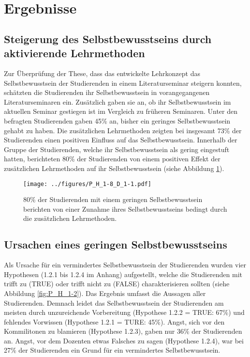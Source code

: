 \section{Ergebnisse}

\subsection{Steigerung des Selbstbewusstseins durch aktivierende Lehrmethoden}
Zur Überprüfung der These, dass das entwickelte Lehrkonzept das Selbstbewusstsein der Studierenden in einem Literaturseminar steigern konnten, schätzten die Studierenden ihr Selbstbewusstsein in vorangegangenen Literaturseminaren ein. Zusätzlich gaben sie an, ob ihr Selbstbewusstsein im aktuellen Seminar gestiegen ist im Vergleich zu früheren Seminaren. Unter den befragten Studierenden gaben 45\% an, bisher ein geringes Selbstbewusstsein gehabt zu haben. Die zusätzlichen Lehrmethoden zeigten bei insgesamt 73\% der Studierenden einen positiven Einfluss auf das Selbstbewusstsein. Innerhalb der Gruppe der Studierenden, welche ihr Selbstbewusstsein als gering eingestuft hatten, berichteten 80\% der Studierenden von einem positiven Effekt der zusätzlichen Lehrmethoden auf ihr Selbstbewusstsein (siehe Abbildung \ref{fig:P_H_1-8_D_1-1}).

\begin{figure}[h!]
\begin{center}
	\texttt{[image: ../figures/P\_H\_1-8\_D\_1-1.pdf]}
\end{center}
	\caption{ 80\% der Studierenden mit einem geringen Selbstbewusstsein berichten von einer Zunahme ihres Selbstbewusstseins bedingt durch die zusätzlichen Lehrmethoden.}
	\label{fig:P_H_1-8_D_1-1}
\end{figure}

\subsection{Ursachen eines geringen Selbstbewusstseins}
Als Ursache für ein vermindertes Selbstbewusstsein der Studierenden wurden vier Hypothesen (1.2.1 bis 1.2.4 im Anhang) aufgestellt, welche die Studierenden mit trifft zu (TRUE) oder trifft nicht zu (FALSE) charakterisieren sollten (siehe Abbildung \ref{fig:P_H_1-2}). Das Ergebnis umfasst die Aussagen aller Studierenden. Demnach leidet das Selbstbewusstsein der Studierenden am meisten durch unzureichende Vorbereitung (Hypothese 1.2.2 = TRUE: 67\%) und fehlendes Vorwissen (Hypothese 1.2.1 = TURE: 45\%). Angst, sich vor den Kommilitonen zu blamieren (Hypothese 1.2.3), gaben nur 36\% der Studierenden an. Angst, vor dem Dozenten etwas Falsches zu sagen (Hypothese 1.2.4), war bei 27\% der Studierenden ein Grund für ein vermindertes Selbstbewusstsein.   

